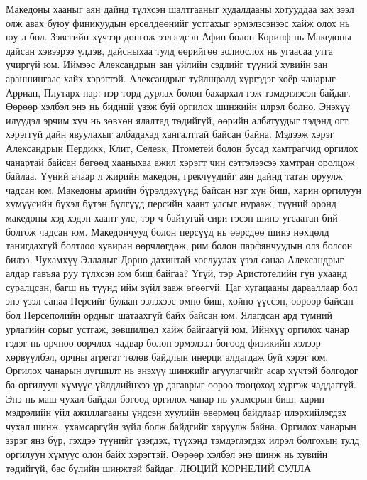 Македоны хааныг аян дайнд түлхсэн шалтгааныг худалдааны хотууддаа зах зээл олж авах буюу финикуудын өрсөлдөөнийг устгахыг эрмэлзсэнээс хайж олох нь юу л бол. Зэвсгийн хүчээр дөнгөж эзлэгдсэн Афин болон Коринф нь Македоны дайсан хэвээрээ үлдэв, дайсныхаа тулд өөрийгөө золиослох нь угаасаа утга учиргүй юм. Иймээс Александрын зан үйлийн сэдлийг түүний хувийн зан араншингаас хайх хэрэгтэй. Александрыг туйлшралд хүргэдэг хоёр чанарыг Арриан, Плутарх нар: нэр төрд дурлах болон бахархал гэж тэмдэглэсэн байдаг. Өөрөөр хэлбэл энэ нь бидний үзэж буй оргилох шинжийн илрэл болно. Энэхүү илүүдэл эрчим хүч нь зөвхөн ялалтад төдийгүй, өөрийн албатуудыг тэдэнд огт хэрэггүй дайн явуулахыг албадахад хангалттай байсан байна.
Мэдээж хэрэг Александрын Пердикк, Клит, Селевк, Птометей болон бусад хамтрагчид оргилох чанартай байсан бөгөөд хааныхаа ажил хэрэгт чин сэтгэлээсээ хамтран оролцож байлаа. Үүний ачаар л жирийн македон, грекчүүдийг аян дайнд татан оруулж чадсан юм. Македоны армийн бүрэлдэхүүнд байсан нэг хүн биш, харин оргилуун хүмүүсийн бүхэл бүтэн бүлгүүд персийн хаант улсыг нурааж, түүний оронд македоны хэд хэдэн хаант улс, тэр ч байтугай сири гэсэн шинэ угсаатан бий болгож чадсан юм. Македончууд болон персүүд нь өөрсдөө шинэ нөхцөлд танигдахгүй болтлоо хувиран өөрчлөгдөж, рим болон парфянчуудын олз болсон билээ.
Чухамхүү Элладыг Дорно дахинтай хослуулах үзэл санаа Александрыг алдар гавъяа руу түлхсэн юм биш байгаа? Үгүй, тэр Аристотелийн гүн ухаанд суралцсан, багш нь түүнд ийм зүйл зааж өгөөгүй. Цаг хугацааны дарааллаар бол энэ үзэл санаа Персийг булаан эзлэхээс өмнө биш, хойно үүссэн, өөрөөр байсан бол Персеполийн ордныг шатаахгүй байх байсан юм. Ялагдсан ард түмний урлагийн сорыг устгаж, зөвшилцөл хайж байгаагүй юм.
Ийнхүү оргилох чанар гэдэг нь орчноо өөрчлөх чадвар болон эрмэлзэл бөгөөд физикийн хэлээр хөрвүүлбэл, орчны агрегат төлөв байдлын инерци алдагдаж буй хэрэг юм. Оргилох чанарын лугшилт нь энэхүү шинжийг агуулагчийг асар хүчтэй болгодог ба оргилуун хүмүүс үйлдлийнхээ үр дагаврыг өөрөө тооцоход хүргэж чаддаггүй. Энэ нь маш чухал байдал бөгөөд оргилох чанар нь ухамсрын биш, харин мэдрэлийн үйл ажиллагааны үндсэн хуулийн өвөрмөц байдлаар илэрхийлэгдэх чухал шинж, ухамсаргүйн зүйл болж байдгийг харуулж байна. Оргилох чанарын зэрэг янз бүр, гэхдээ түүнийг үзэгдэх, түүхэнд тэмдэглэгдэх илрэл болгохын тулд оргилуун хүмүүс олон байх хэрэгтэй. Өөрөөр хэлбэл энэ шинж нь хувийн төдийгүй, бас бүлийн шинжтэй байдаг.
ЛЮЦИЙ КОРНЕЛИЙ СУЛЛА
